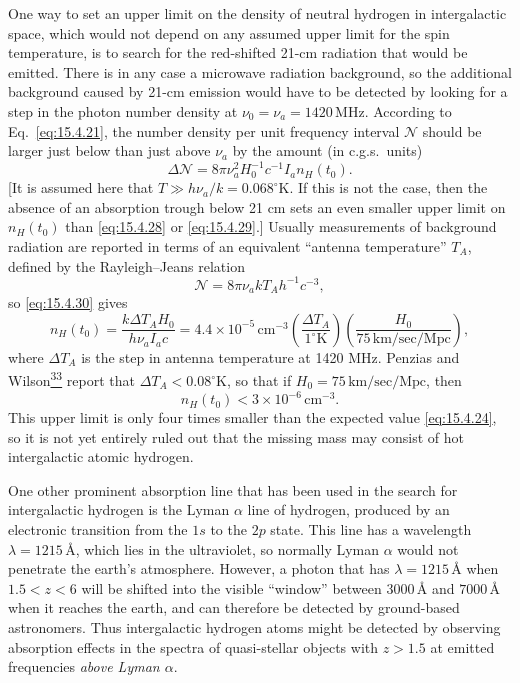 One way to set an upper limit on the density of neutral hydrogen in
intergalactic space, which would not depend on any assumed upper limit for the
spin temperature, is to search for the red-shifted 21-cm radiation that would
be emitted. There is in any case a microwave radiation background, so the
additional background caused by 21-cm emission would have to be detected by
looking for a step in the photon number density at
\(\nu_0=\nu_a=1420\,\mathrm{MHz}\). According to Eq.~\eqref{eq:15.4.21},
the number density per unit frequency interval \(\mathcal N\) should be larger
just below than just above \(\nu_a\) by the amount (in c.g.s.\ units)
\begin{equation}
  \Delta\mathcal N
  =
  8\pi\nu_a^2H_0^{-1}c^{-1}I_an_H(t_0).
  \tag{15.4.30}\label{eq:15.4.30}
\end{equation}
[It is assumed here that \(T\gg h\nu_a/k=0.068^\circ\mathrm{K}\). If this is
not the case, then the absence of an absorption trough below 21 cm sets an even
smaller upper limit on \(n_H(t_0)\) than \eqref{eq:15.4.28} or
\eqref{eq:15.4.29}.] Usually measurements of background radiation are
reported in terms of an equivalent ``antenna temperature'' \(T_A\), defined by
the Rayleigh--Jeans relation
\begin{equation}
  \mathcal N=8\pi\nu_akT_Ah^{-1}c^{-3},
  \tag{15.4.31}\label{eq:15.4.31}
\end{equation}
so \eqref{eq:15.4.30} gives
\begin{equation}
  n_H(t_0)
  =
  \frac{k\Delta T_AH_0}{h\nu_aI_ac}
  =
  4.4\times10^{-5}\,\mathrm{cm^{-3}}
  \left(\frac{\Delta T_A}{1^\circ\mathrm{K}}\right)
  \left(\frac{H_0}{75\,\mathrm{km/sec/Mpc}}\right),
  \tag{15.4.32}\label{eq:15.4.32}
\end{equation}
where \(\Delta T_A\) is the step in antenna temperature at 1420 MHz. Penzias
and Wilson\hyperref[ch15-ref-33]{\textsuperscript{33}} report that
\(\Delta T_A<0.08^\circ\mathrm{K}\), so that if
\(H_0=75\,\mathrm{km/sec/Mpc}\), then
\begin{equation}
  n_H(t_0)<3\times10^{-6}\,\mathrm{cm^{-3}}.
  \tag{15.4.33}\label{eq:15.4.33}
\end{equation}
This upper limit is only four times smaller than the expected value
\eqref{eq:15.4.24}, so it is not yet entirely ruled out that the missing mass
may consist of hot intergalactic atomic hydrogen.

One other prominent absorption line that has been used in the search for
intergalactic hydrogen is the Lyman \(\alpha\) line of hydrogen, produced by
an electronic transition from the \(1s\) to the \(2p\) state. This line has a
wavelength \(\lambda=1215\,\text{\AA}\), which lies in the ultraviolet, so
normally Lyman \(\alpha\) would not penetrate the earth's atmosphere. However,
a photon that has \(\lambda=1215\,\text{\AA}\) when \(1.5<z<6\) will be
shifted into the visible ``window'' between \(3000\,\text{\AA}\) and
\(7000\,\text{\AA}\) when it reaches the earth, and can therefore be detected
by ground-based astronomers. Thus intergalactic hydrogen atoms might be
detected by observing absorption effects in the spectra of quasi-stellar
objects with \(z>1.5\) at emitted frequencies \emph{above Lyman \(\alpha\)}.

